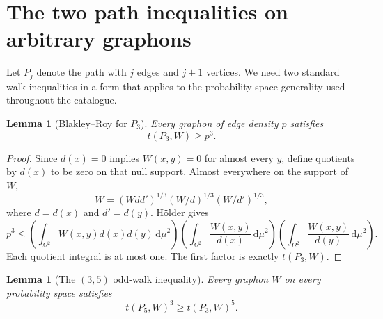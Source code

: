 \documentclass[11pt]{article}
\newtheorem{lemma}[theorem]{Lemma}
\newcommand{\dd}{\,\mathrm d}
\begin{document}
\section{The two path inequalities on arbitrary graphons}
\label{sec:paths}

Let $P_j$ denote the path with $j$ edges and $j+1$ vertices.  We need two
standard walk inequalities in a form that applies to the probability-space
generality used throughout the catalogue.

\begin{lemma}[Blakley--Roy for $P_3$]
\label{lem:BR}
Every graphon of edge density $p$ satisfies
\[
 t(P_3,W)\geq p^3.
\]
\end{lemma}

\begin{proof}
Since $d(x)=0$ implies $W(x,y)=0$ for almost every $y$, define quotients by
$d(x)$ to be zero on that null support.  Almost everywhere on the support of
$W$,
\[
 W=(Wdd')^{1/3}(W/d)^{1/3}(W/d')^{1/3},
\]
where $d=d(x)$ and $d'=d(y)$.  H\"older gives
\[
 p^3\leq
 \left(\int_{\Omega^2}W(x,y)d(x)d(y)\dd\mu^2\right)
 \left(\int_{\Omega^2}\frac{W(x,y)}{d(x)}\dd\mu^2\right)
 \left(\int_{\Omega^2}\frac{W(x,y)}{d(y)}\dd\mu^2\right).
\]
Each quotient integral is at most one.  The first factor is exactly
$t(P_3,W)$.
\end{proof}

\begin{lemma}[The $(3,5)$ odd-walk inequality]
\label{lem:odd-walk}
Every graphon $W$ on every probability space satisfies
\[
 t(P_5,W)^3\geq t(P_3,W)^5.
\]
\end{lemma}
\end{document}
